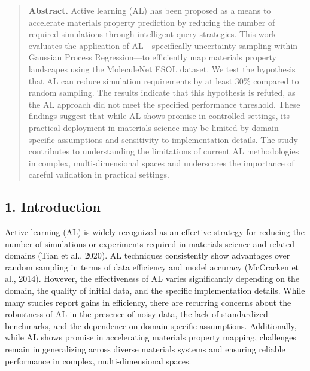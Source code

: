 \vspace{0.5em}

\begin{quote}\small
\textbf{Abstract.} Active learning (AL) has been proposed as a means to
accelerate materials property prediction by reducing the number of required
simulations through intelligent query strategies. This work evaluates the
application of AL---specifically uncertainty sampling within Gaussian Process
Regression---to efficiently map materials property landscapes using the
MoleculeNet ESOL dataset. We test the hypothesis that AL can reduce simulation
requirements by at least 30\% compared to random sampling. The results indicate
that this hypothesis is refuted, as the AL approach did not meet the specified
performance threshold. These findings suggest that while AL shows promise in
controlled settings, its practical deployment in materials science may be
limited by domain-specific assumptions and sensitivity to implementation
details. The study contributes to understanding the limitations of current AL
methodologies in complex, multi-dimensional spaces and underscores the
importance of careful validation in practical settings.
\end{quote}

\begingroup\small

\subsection*{1. Introduction}

Active learning (AL) is widely recognized as an effective strategy for reducing the number of simulations or experiments required in materials science and related domains (Tian et al., 2020). AL techniques consistently show advantages over random sampling in terms of data efficiency and model accuracy (McCracken et al., 2014). However, the effectiveness of AL varies significantly depending on the domain, the quality of initial data, and the specific implementation details. While many studies report gains in efficiency, there are recurring concerns about the robustness of AL in the presence of noisy data, the lack of standardized benchmarks, and the dependence on domain-specific assumptions. Additionally, while AL shows promise in accelerating materials property mapping, challenges remain in generalizing across diverse materials systems and ensuring reliable performance in complex, multi-dimensional spaces.

